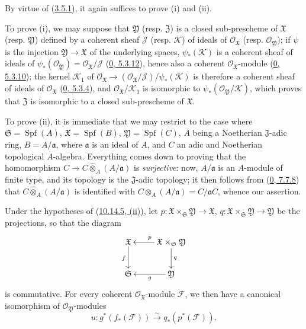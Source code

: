 By virtue of (\hyperref[I.3.5.1]{3.5.1}), it again suffices to prove (i)
and (ii).

To prove (i), we may suppose that $\mathfrak{Y}$ (resp.
$\mathfrak{Z}$) is a closed sub-prescheme of $\mathfrak{X}$ (resp.
$\mathfrak{Y}$) defined by a coherent sheaf $\mathscr{J}$ (resp.
$\mathscr{K}$) of ideals of $\mathscr{O}_{\mathfrak{X}}$ (resp.
$\mathscr{O}_{\mathfrak{Y}}$); if $\psi$ is the injection
$\mathfrak{Y}\to\mathfrak{X}$ of the underlying spaces,
$\psi_*(\mathscr{K})$ is a coherent sheaf of ideals of
$\psi_*(\mathscr{O}_{\mathfrak{Y}})
=\mathscr{O}_{\mathfrak{X}}/\mathscr{J}$
(\hyperref[0.5.3.12]{0, 5.3.12}), hence also a
coherent $\mathscr{O}_{\mathfrak{X}}$-module
(\hyperref[0.5.3.10]{0, 5.3.10}); the kernel $\mathscr{K}_1$ of
$\mathscr{O}_{\mathfrak{X}}\to
(\mathscr{O}_{\mathfrak{X}}/\mathscr{J})/\psi_*(\mathscr{K})$ is therefore a
coherent sheaf of ideals of $\mathscr{O}_{\mathfrak{X}}$
(\hyperref[0.5.3.4]{0, 5.3.4}), and
$\mathscr{O}_{\mathfrak{X}}/\mathscr{K}_1$ is isomorphic to
$\psi_*(\mathscr{O}_{\mathfrak{Y}}/\mathscr{K})$, which proves that
$\mathfrak{Z}$ is isomorphic to a closed sub-prescheme of $\mathfrak{X}$.

To prove (ii), it is immediate that we may restrict to the case where
$\mathfrak{S}=\operatorname{Spf}(A)$,
$\mathfrak{X}=\operatorname{Spf}(B)$,
$\mathfrak{Y}=\operatorname{Spf}(C)$, $A$ being a Noetherian
$\mathfrak{J}$-adic ring, $B=A/\mathfrak{a}$, where $\mathfrak{a}$ is
an ideal of $A$, and $C$ an adic and Noetherian topological $A$-algebra.
Everything comes down to proving that the homomorphism
$C\to C\widehat{\otimes}_A(A/\mathfrak{a})$ is \emph{surjective}: now,
$A/\mathfrak{a}$ is an $A$-module of finite type, and its topology is the
$\mathfrak{J}$-adic topology; it then follows from
(\hyperref[0.7.7.8]{0, 7.7.8}) that
$C\widehat{\otimes}_A(A/\mathfrak{a})$ is identified with
$C\otimes_A(A/\mathfrak{a})=C/\mathfrak{a}C$, whence our assertion.

\begin{corollary}[10.14.6]
\label{I.10.14.6}
Under the hypotheses of (\hyperref[I.10.14.5]{10.14.5, (ii)}), let
$p:\mathfrak{X}\times_{\mathfrak{S}}\mathfrak{Y}\to\mathfrak{X}$,
$q:\mathfrak{X}\times_{\mathfrak{S}}\mathfrak{Y}\to\mathfrak{Y}$ be the
projections, so that the diagram
\[
  \xymatrix{
    \mathfrak{X} \ar[d]_{f}
    & \mathfrak{X}\times_{\mathfrak{S}}\mathfrak{Y}
      \ar[l]_{p} \ar[d]^{q}\\
    \mathfrak{S}
    & \mathfrak{Y} \ar[l]^{g}
  }
\]
is commutative. For every coherent $\mathscr{O}_{\mathfrak{X}}$-module
$\mathscr{F}$, we then have a canonical isomorphism of
$\mathscr{O}_{\mathfrak{Y}}$-modules
\[
  \label{I.10.14.6.1}
  u:g^*(f_*(\mathscr{F}))
  \xrightarrow{\sim}
  q_*(p^*(\mathscr{F})).
  \tag{10.14.6.1}
\]
\end{corollary}

